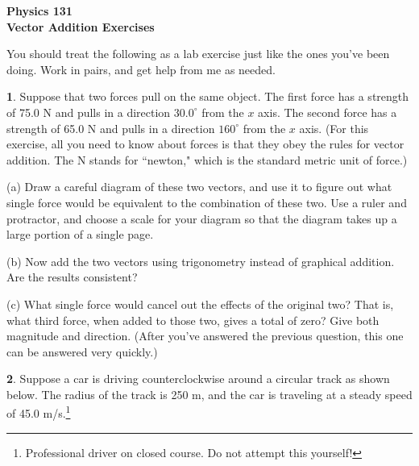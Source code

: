 \documentclass{article}
\begin{document}
\begin{center}
{\bf Physics 131}\\
{\bf Vector Addition Exercises}
\end{center}

\bigskip\bigskip

You should treat the following as a lab exercise just like the ones
you've been doing. Work in pairs, and get help from me as needed.

\bigskip

{\bf 1}.
Suppose that two forces pull on the same object.  The first force has
a strength of 75.0 N and pulls in a direction $30.0^\circ$ from the $x$
axis.  The second force has a strength of 65.0 N and pulls in a direction 
$160^\circ$ from the $x$ axis.  (For this exercise, all you need
to know about forces is that they obey the rules for vector addition.
The N stands for ``newton," which is the standard metric unit of force.)

(a) Draw a careful diagram of these two vectors, and use it to figure out
what single force would be equivalent to the combination of these two.
Use a ruler and protractor, and choose a scale for your diagram so that
the diagram takes up a large portion of a single page.

(b) Now add the two vectors using 
trigonometry instead
of graphical addition.  Are the results consistent?

\vfil\vfil

(c) What single force would cancel out the effects of the original two?  That
is, what third force, when added to those two, gives a total of zero?
Give both magnitude and direction.  (After you've answered the
previous question, this one can be answered very quickly.)

\vfil\eject


{\bf 2}.  Suppose a car is driving counterclockwise around a circular track as shown
below.  The radius of the track is 250 m, and the car is traveling
at a steady speed of 45.0 m/s.\footnote{Professional driver on closed
course.  Do not attempt this yourself!}
\end{document}
